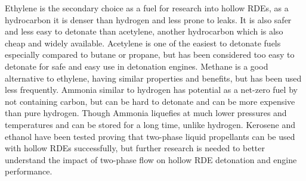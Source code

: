 \documentclass{article}
\begin{document}
Ethylene is the secondary choice as a fuel for research into hollow RDEs, as a hydrocarbon it is denser than hydrogen and less prone to leaks. It is also safer and less easy to detonate than acetylene, another hydrocarbon which is also cheap and widely available. Acetylene is one of the easiest to detonate fuels especially compared to butane or propane, but has been considered too easy to detonate for safe and easy use in detonation engines. Methane is a good alternative to ethylene, having similar properties and benefits, but has been used less frequently. Ammonia similar to hydrogen has potential as a net-zero fuel by not containing carbon, but can be hard to detonate \cite{Huang2022,1Huang2022} and can be more expensive than pure hydrogen. Though Ammonia liquefies at much lower pressures and temperatures and can be stored for a long time, unlike hydrogen. Kerosene \cite{Xue2022} and ethanol \cite{1ISHIHARA2023} have been tested proving that two-phase liquid propellants can be used with hollow RDEs successfully, but further research is needed to better understand the impact of two-phase flow on hollow RDE detonation and engine performance. 
\par
\end{document}

